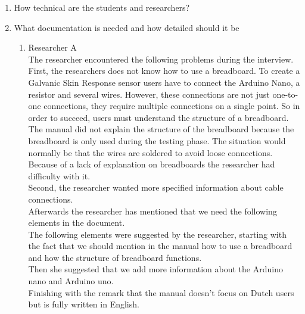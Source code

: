 \documentclass[conference]{IEEEtran}
\begin{document}
		\begin{enumerate}
			\item How technical are the students and researchers?
				\item What documentation is needed and how detailed should it be
				
				\begin{enumerate}
					\item Researcher A\\

						The researcher encountered the following problems during the interview.\\

						First, the researchers does not know how to use a breadboard. To create a Galvanic Skin Response sensor users have to connect the Arduino Nano, a resistor and several wires. However, these connections are not just one-to-one connections, they require multiple connections on a single point. So in order to succeed, users must understand the structure of a breadboard. The manual did not explain the structure of the breadboard because the breadboard is only used during the testing phase. The situation would normally be that the wires are soldered to avoid loose connections. Because of a lack of explanation on breadboards the researcher had difficulty with it.\\
						Second, the researcher wanted more specified information about cable connections.\\
						Afterwards the researcher has mentioned that we need the following elements in the document.\\
						The following elements were suggested by the researcher, starting with the fact that we should mention in the manual how to use a breadboard and how the structure of breadboard functions. \\
						Then she suggested that we add more information about the Arduino nano and Arduino uno.\\
						Finishing with the remark that the manual doesn't focus on Dutch users but is fully written in English.\\		
						

\end{enumerate}
\end{enumerate}
\end{document}
